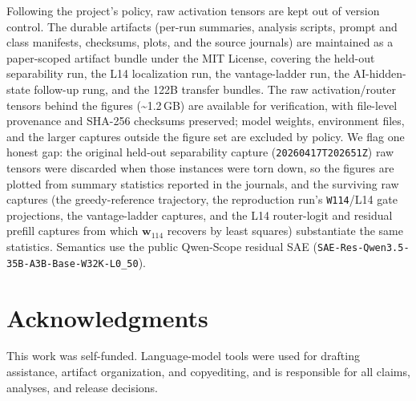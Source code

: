 \documentclass[10pt,a4paper,twocolumn]{article}
\newcommand{\wvec}{\mathbf{w}_{114}}
\begin{document}
Following the project's policy, raw activation tensors are kept out of version
control. The durable artifacts (per-run summaries, analysis scripts, prompt and
class manifests, checksums, plots, and the source journals) are maintained as a
paper-scoped artifact bundle under the MIT License, covering the held-out
separability run, the L14 localization run, the vantage-ladder run, the
AI-hidden-state follow-up rung, and the 122B transfer bundles. The raw
activation/router tensors behind the figures
(\textasciitilde1.2\,GB) are available for verification, with
file-level provenance and SHA-256 checksums preserved; model weights, environment
files, and the larger captures outside the figure set are excluded by policy. We flag one
honest gap: the original held-out separability capture
(\texttt{20260417T202651Z}) raw tensors were discarded when those instances were
torn down, so the figures are plotted from summary statistics reported in the
journals, and the surviving raw captures (the greedy-reference trajectory, the
reproduction run's \texttt{W114}/L14 gate projections, the vantage-ladder
captures, and the L14 router-logit and residual prefill captures from which
$\wvec$ recovers by least squares) substantiate the same statistics. Semantics
use the public Qwen-Scope residual SAE
(\texttt{SAE-Res-Qwen3.5-35B-A3B-Base-W32K-L0\_50}).

\section*{Acknowledgments}

This work was self-funded. Language-model tools were used for drafting
assistance, artifact organization, and copyediting, and is responsible for all
claims, analyses, and release decisions.
\end{document}

